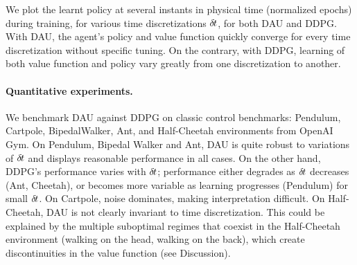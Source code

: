 We plot the learnt policy at several instants in physical time
(normalized epochs) during training, for various time discretizations
${\delta\hspace{-.1em}t}$, for both DAU and DDPG. With DAU, the agent's policy and value
function quickly converge for every time discretization without specific
tuning. On the contrary, with DDPG, learning of both value function and
policy vary greatly from one discretization to another.

\paragraph{Quantitative experiments.}
We benchmark DAU against DDPG on classic control benchmarks: Pendulum,
Cartpole, BipedalWalker, Ant, and Half-Cheetah environments from OpenAI Gym. On
Pendulum, Bipedal Walker and Ant, DAU is quite robust to variations of
${\delta\hspace{-.1em}t}$ and displays reasonable performance in all cases. On the other hand,
DDPG's performance varies with ${\delta\hspace{-.1em}t}$; performance either degrades as
${\delta\hspace{-.1em}t}$ decreases (Ant, Cheetah), or becomes more variable as learning
progresses (Pendulum) for small ${\delta\hspace{-.1em}t}$. On Cartpole, noise dominates,
making interpretation difficult. On Half-Cheetah, DAU is not clearly
invariant to time discretization. This could be explained by the multiple
suboptimal regimes that coexist in the Half-Cheetah environment (walking on the
head, walking on the back), which create discontinuities in the value
function (see Discussion).

% 


